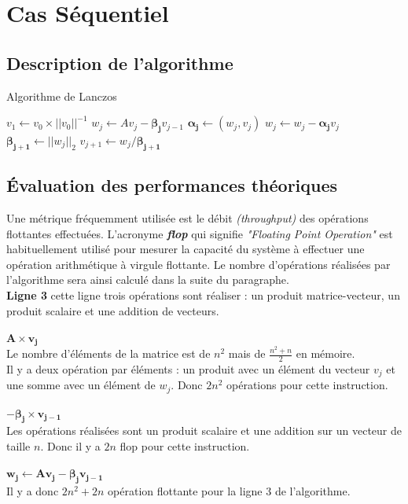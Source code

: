 \documentclass[11pt,french]{article}
\begin{document}
	\section{Cas Séquentiel}
	
	\subsection{Description de l'algorithme}
	\begin{algorithm}
		\caption{Algorithme de Lanczos}\label{alg:lanczos}
		\begin{algorithmic}[1]
			\State $v_1 \gets v_0 \times|| v_0||^{-1} $
				\State $w_j \gets Av_j - \boldsymbol{\beta_j }v_{j-1}$
				\State $\boldsymbol{\alpha_j} \gets (w_j,v_j)$
				\State $w_j \gets w_j - \boldsymbol{\alpha_j} v_j$
				\State $\boldsymbol{\beta_{j+1}} \gets || w_j||_2$
				\State $ v_{j+1} \gets w_j /\boldsymbol{\beta_{j+1}} $
			\EndFor
			\State \Return 
		\end{algorithmic}
	\end{algorithm}
	
	\subsection{Évaluation des performances théoriques}
	Une métrique fréquemment utilisée est le débit \emph{(throughput)} des opérations flottantes effectuées. L’acronyme \textbf{\emph{flop}} qui signifie \emph{"Floating Point Operation"} est habituellement utilisé pour mesurer la capacité du système à effectuer une opération arithmétique à virgule flottante. Le nombre d'opérations réalisées par l'algorithme sera ainsi calculé dans la suite du paragraphe.  \\

	\noindent \textbf{Ligne  3}
	cette ligne trois opérations sont réaliser : un produit matrice-vecteur, un produit scalaire et une addition de vecteurs. \\ \\
	$\boldsymbol{ A \times v_j}$\\
	Le nombre d’éléments de la matrice est de $n^2$ mais de $\frac{n^2 + n}{2}$  en mémoire.\\
	Il y a deux opération par éléments :  un produit avec un élément du vecteur  $v_j$ et une somme avec un élément de $w_j$.
	Donc $2n^2$ opérations pour cette instruction. \\ \\
	$\boldsymbol{ - \beta_j \times v_{j - 1}}$\\
	Les opérations réalisées sont un produit scalaire et une addition sur un vecteur de taille $n$.
	Donc il y a $2n$ flop pour cette instruction. \\  \\
	\noindent $\boldsymbol{w_j \gets Av_j - \beta_j  v_{j-1}}$ \\
	Il y a donc $2n^2 + 2n$ opération flottante pour la ligne 3 de l'algorithme.  \\
	
\end{document}
